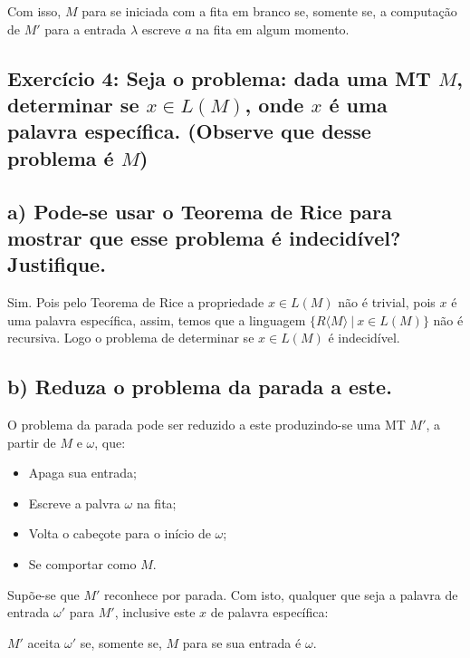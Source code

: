 Com isso, $M$ para se iniciada com a fita em branco se, somente se, a computação de $M'$ para a entrada $\lambda$ escreve $a$ na fita em algum momento.




\subsection*{Exercício 4: Seja o problema: dada uma MT $M$, determinar se $x \in L(M)$, onde $x$ é uma palavra específica. (Observe que  desse problema é $M$)}

\subsection*{a) Pode-se usar o Teorema de Rice para mostrar que esse problema é indecidível? Justifique.}

Sim. Pois pelo Teorema de Rice a propriedade $x \in L(M)$ não é trivial, pois $x$ é uma palavra específica, assim, temos que a linguagem $\{R\langle M \rangle ~|~ x \in L(M)\}$ não é recursiva. Logo o problema de determinar se $x \in L(M)$ é indecidível.

\subsection*{b) Reduza o problema da parada a este.}

O problema da parada pode ser reduzido a este produzindo-se uma MT $M'$, a partir de $M$ e $\omega$, que:

\begin{itemize}
    \item Apaga sua entrada;
    \item Escreve a palvra $\omega$ na fita;
    \item Volta o cabeçote para o início de $\omega$;
    \item Se comportar como $M$.
\end{itemize}

Supõe-se que $M'$ reconhece por parada. Com isto, qualquer que seja a palavra de entrada $\omega'$ para $M'$, inclusive este $x$ de palavra específica:

$M'$ aceita $\omega'$ se, somente se, $M$ para se sua entrada é $\omega$.

